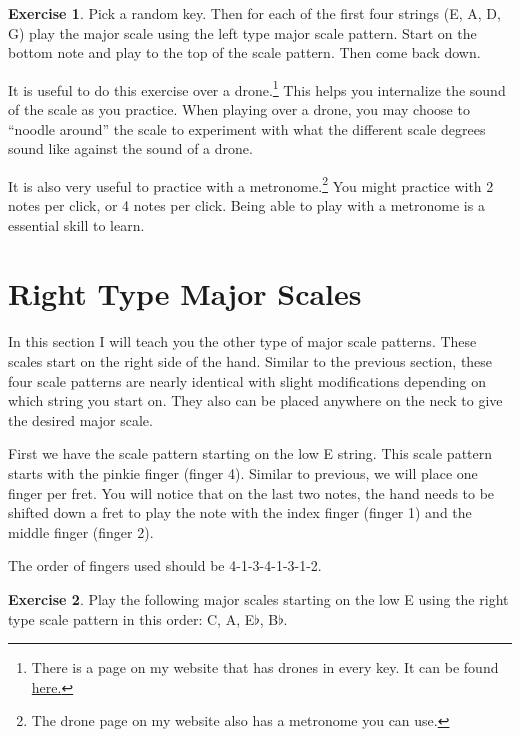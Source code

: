 \documentclass[12pt]{article}
\theoremstyle{definition}
\newtheorem{exercise}{Exercise}
\begin{document}
\begin{exercise} \label{ex:randomkey1}
Pick a random key. Then for each of the first four strings (E, A, D, G) play the major scale using the left type major scale pattern. Start on the bottom note and play to the top of the scale pattern. Then come back down. 
\end{exercise}

It is useful to do this exercise over a drone.\footnote{There is a page on my website that has drones in every key. It can be found \href{https://ahballif.github.io/AddisonGuitarResources/drones.html}{here.}}
This helps you internalize the sound of the scale as you practice. 
When playing over a drone, you may choose to ``noodle around'' the scale to experiment with what the different scale degrees sound like against the sound of a drone. 

It is also very useful to practice with a metronome.\footnote{The drone page on my website also has a metronome you can use. }
You might practice with 2 notes per click, or 4 notes per click. Being able to play with a metronome is a essential skill to learn. 

\section{Right Type Major Scales}
In this section I will teach you the other type of major scale patterns. These scales start on the right side of the hand. Similar to the previous section, these four scale patterns are nearly identical with slight modifications depending on which string you start on. They also can be placed anywhere on the neck to give the desired major scale. 

First we have the scale pattern starting on the low E string. This scale pattern starts with the pinkie finger (finger 4). 
Similar to previous, we will place one finger per fret. You will notice that on the last two notes, the hand needs to be shifted down a fret to play the note with the index finger (finger 1) and the middle finger (finger 2).

The order of fingers used should be 4-1-3-4-1-3-1-2.

\begin{exercise}
Play the following major scales starting on the low E using the right type scale pattern in this order: C, A, E$\flat$, B$\flat$.
\end{exercise}
\end{document}
